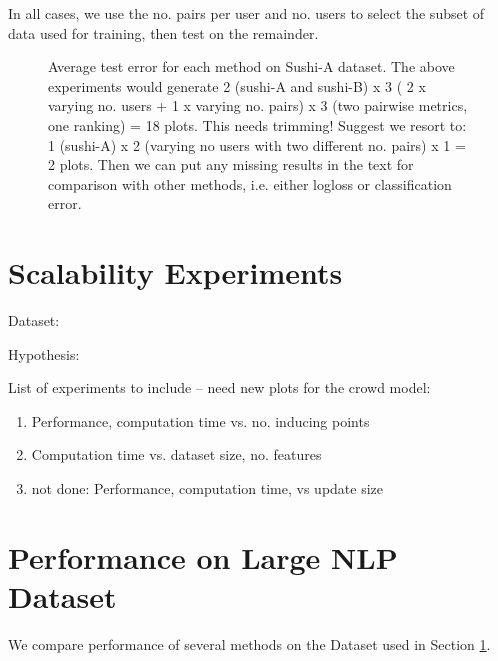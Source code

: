

In all cases, we use the no. pairs per user and no. users to select the subset of data used for training, then test on the remainder.

\begin{figure}
\caption{
Average test error for each method on Sushi-A dataset.
The above experiments would generate 2 (sushi-A and sushi-B) x 3 ( 2 x varying no. users +
1 x varying no. pairs) x 3 (two pairwise metrics, one ranking) = 18 plots. This needs trimming!
Suggest we resort to:
1 (sushi-A) x 2 (varying no users with two different no. pairs) x 1 = 2 plots. Then we can put
any missing results in the text for comparison with other methods, i.e. either logloss or 
classification error.
}
\end{figure}

\section{Scalability Experiments}\label{sec:exp_scale}

Dataset:

Hypothesis: 

List of experiments to include -- need new plots for the crowd model:
\begin{enumerate}
\item Performance, computation time vs. no. inducing points
\item Computation time vs. dataset size, no. features
\item not done: Performance, computation time, vs update size
\end{enumerate}

\section{Performance on Large NLP Dataset}\label{sec:exp_nlp}

We compare performance of several methods on the Dataset used in Section \ref{sec:exp_scale}.

